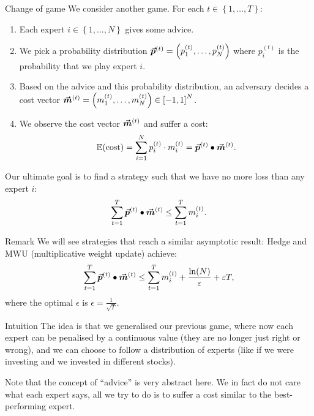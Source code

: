 \documentclass[a4paper]{article}
\begin{document}
\begin{parag}{Change of game}
    We consider another game. For each $t \in \left\{1, \ldots, T\right\}$:
    \begin{enumerate}
        \item Each expert $i \in \left\{1, \ldots, N\right\}$ gives some advice.
        \item We pick a probability distribution $\bvec{p}^{\left(t\right)} = \left(p_1^{\left(t\right)}, \ldots, p_N^{\left(t\right)}\right)$ where $p_i^{\left(t\right)}$ is the probability that we play expert $i$.
        \item Based on the advice and this probability distribution, an adversary decides a cost vector $\bvec{m}^{\left(t\right)} = \left(m_1^{\left(t\right)}, \ldots, m_N^{\left(t\right)}\right) \in \left[-1, 1\right]^{N}$.
        \item We observe the cost vector $\bvec{m}^{\left(t\right)}$ and suffer a cost: 
        \[\exval\left(\text{cost}\right) = \sum_{i=1}^{N} p_i^{\left(t\right)} \cdot m_i^{\left(t\right)} = \bvec{p}^{\left(t\right)} \dotprod \bvec{m}^{\left(t\right)}.\]
    \end{enumerate}

    Our ultimate goal is to find a strategy such that we have no more loss than any expert $i$: 
    \[\sum_{t=1}^{T} \bvec{p}^{\left(t\right)} \dotprod \bvec{m}^{\left(t\right)} \leq \sum_{t=1}^{T} m_i^{\left(t\right)}.\]

    \begin{subparag}{Remark}
        We will see strategies that reach a similar asymptotic result: Hedge and MWU (multiplicative weight update) achieve:
        \[\sum_{t=1}^{T} \bvec{p}^{\left(t\right)} \dotprod \bvec{m}^{\left(t\right)} \leq \sum_{t=1}^{T} m_i^{\left(t\right)} + \frac{\ln\left(N\right)}{\epsilon} + \epsilon T,\]
        where the optimal $\epsilon$ is $\epsilon = \frac{1}{\sqrt{T}}$.
    \end{subparag}

    \begin{subparag}{Intuition}
        The idea is that we generalised our previous game, where now each expert can be penalised by a continuous value (they are no longer just right or wrong), and we can choose to follow a distribution of experts (like if we were investing and we invested in different stocks).

        Note that the concept of ``advice'' is very abstract here. We in fact do not care what each expert says, all we try to do is to suffer a cost similar to the best-performing expert.
    \end{subparag}
\end{parag}
\end{document}
